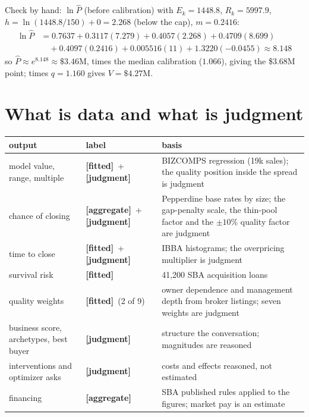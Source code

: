 \documentclass[11pt]{article}
\newcommand{\fit}{\textbf{[fitted]}}
\newcommand{\agg}{\textbf{[aggregate]}}
\newcommand{\jud}{\textbf{[judgment]}}
\begin{document}
Check by hand: $\ln\hat P$ (before calibration) with $E_k=1448.8$, $R_k=5997.9$, $h=\ln(1448.8/150)+0=2.268$ (below the cap), $m=0.2416$:
\begin{align*}\ln\hat P&=0.7637+0.3117(7.279)+0.4057(2.268)+0.4709(8.699)\\&\quad+0.4097(0.2416)+0.005516(11)+1.3220(-0.0455)\approx 8.148\end{align*}
so $\hat P\approx e^{8.148}\approx\$3.46$M, times the median calibration ($1.066$), giving the \$3.68M point; times $q=1.160$ gives $V=\$4.27$M.

\section{What is data and what is judgment}
\begin{center}\small\begin{tabular}{p{4.3cm}p{2.2cm}p{7cm}}\toprule
output & label & basis\\\midrule
model value, range, multiple & \fit\ + \jud & BIZCOMPS regression (19k sales); the quality position inside the spread is judgment\\
chance of closing & \agg\ + \jud & Pepperdine base rates by size; the gap-penalty scale, the thin-pool factor and the $\pm10\%$ quality factor are judgment\\
time to close & \fit\ + \jud & IBBA histograms; the overpricing multiplier is judgment\\
survival risk & \fit & 41,200 SBA acquisition loans\\
quality weights & \fit\ (2 of 9) & owner dependence and management depth from broker listings; seven weights are judgment\\
business score, archetypes, best buyer & \jud & structure the conversation; magnitudes are reasoned\\
interventions and optimizer asks & \jud & costs and effects reasoned, not estimated\\
financing & \agg & SBA published rules applied to the figures; market pay is an estimate\\\bottomrule\end{tabular}\end{center}
\end{document}
